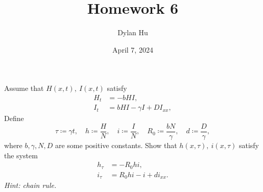\documentclass[plain]{pset}
\title{Homework 6}
\author{Dylan Hu}
\date{April 7, 2024}
\begin{document}
\maketitle

\pagebreak

\begin{problem}
Assume that \(H(x, t),\ I(x,t)\) satisfy
\begin{align*}
    H_t & = -bHI,                     \\
    I_t & = bHI - \gamma I + DI_{xx},
\end{align*}
Define
\[\tau \coloneqq \gamma t, \quad h \coloneqq \frac{H}{N}, \quad i \coloneqq \frac{I}{N}, \quad R_0 \coloneqq \frac{bN}{\gamma}, \quad d \coloneqq \frac{D}{\gamma},\]
where \(b, \gamma, N, D\) are some positive constants. Show that \(h(x,\tau),\ i(x, \tau)\) satisfy the system
\begin{align*}
    h_\tau & = -R_0hi,              \\
    i_\tau & = R_0hi - i + di_{xx}.
\end{align*}
\textit{Hint: chain rule.}
\end{problem}
\end{document}
